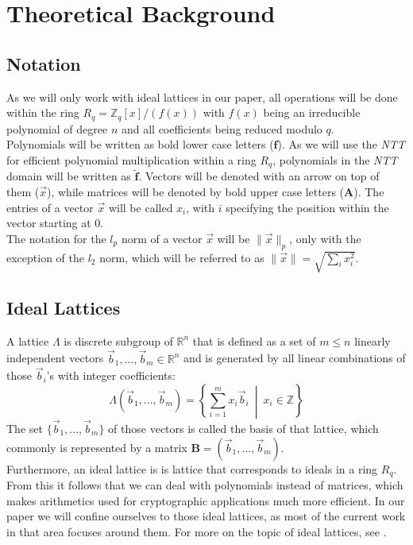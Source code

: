 %
%

\chapter{Theoretical Background}

\section{Notation}
As we will only work with ideal lattices in our paper, all operations will be done within the ring \(R_q=\mathbb{Z}_q[x]/(f(x))\) with \(f(x)\) being an irreducible polynomial of degree \(n\) and all coefficients being reduced modulo \(q\).\\
Polynomials will be written as bold lower case letters (\(\textbf{f}\)). As we will use the \textit{\ac{NTT}} for efficient polynomial multiplication within a ring \(R_q\), polynomials in the \textit{\ac{NTT}} domain will be written as \(\tilde{\textbf{f}}\). Vectors will be denoted with an arrow on top of them (\(\vec{x}\)), while matrices will be denoted by bold upper case letters (\(\textbf{A}\)). The entries of a vector \(\vec{x}\) will be called \(x_i\), with \(i\) specifying the position within the vector starting at 0.\\
The notation for the \(l_p\) norm of a vector \(\vec{x}\) will be \(\|\vec{x}\|_p\), only with the exception of the \(l_2\) norm, which will be referred to as \(\|\vec{x}\|=\sqrt{\sum_{i} x_i^2}\).

\section{Ideal Lattices}
A lattice \(\Lambda\) is discrete subgroup of \(\mathbb{R}^n\) that is defined as a set of \(m \leq n\) linearly independent vectors \(\vec{b}_1,...,\vec{b}_m \in \mathbb{R}^n\) and is generated by all linear combinations of those \(\vec{b}_i\)'s with integer coefficients:
\begin{equation}
	\Lambda(\vec{b}_1,...,\vec{b}_m)=\left \{ \displaystyle \sum_{i=1}^{m} x_i \vec{b}_i \: \middle | \: x_i \in \mathbb{Z} \right \}
\end{equation}
The set \(\{\vec{b}_1,...,\vec{b}_m\}\) of those vectors is called the basis of that lattice, which commonly is represented by a matrix \(\textbf{B}=(\vec{b}_1,...,\vec{b}_m)\).\\
Furthermore, an ideal lattice is is lattice that corresponds to ideals in a ring \(R_q\). From this it follows that we can deal with polynomials instead of matrices, which makes arithmetics used for cryptographic applications much more efficient. In our paper we will confine ourselves to those ideal lattices, as most of the current work in that area focuses around them. For more on the topic of ideal lattices, see \cite{cryptoeprint:2012:230}.

